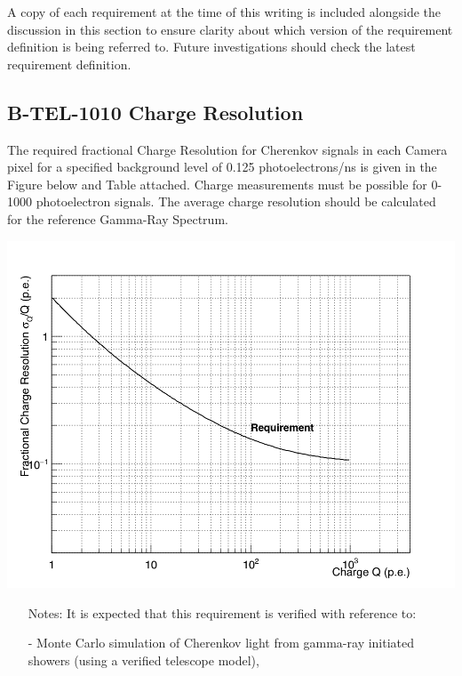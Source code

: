 A copy of each requirement at the time of this writing is included alongside the discussion in this section to ensure clarity about which version of the requirement definition is being referred to. Future investigations should check the latest requirement definition. \vfill

\begin{requirement}{\subsection{B-TEL-1010 Charge Resolution}}
	The required fractional Charge Resolution for Cherenkov signals in each Camera pixel for a specified background level of 0.125 photoelectrons/ns is given in the Figure below and Table attached. Charge measurements must be possible for 0-1000 photoelectron signals. The average charge resolution should be calculated for the reference Gamma-Ray Spectrum.
    
	\centering\includegraphics[width=0.8\linewidth]{figures/images/charge_res_req}
	\label{fig:charge_res_req}
    
\begin{itemize}
\item [Notes:] It is expected that this requirement is verified with reference to:

- Monte Carlo simulation of Cherenkov light from gamma-ray initiated showers (using a verified telescope model),


\end{itemize}
\end{requirement}
